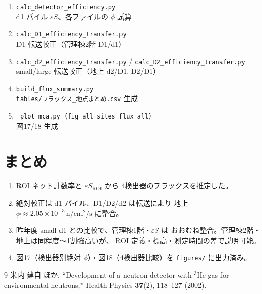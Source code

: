 \documentclass[a4paper,11pt]{ltjsarticle}
\begin{document}
\begin{enumerate}
  \item \texttt{calc\_detector\_efficiency.py} \\
        d1 パイル $\varepsilon S$、各ファイルの $\phi$ 試算
  \item \texttt{calc\_D1\_efficiency\_transfer.py} \\
        D1 転送較正（管理棟2階 D1/d1）
  \item \texttt{calc\_d2\_efficiency\_transfer.py} / \texttt{calc\_D2\_efficiency\_transfer.py} \\
        small/large 転送較正（地上 d2/D1, D2/D1）
  \item \texttt{build\_flux\_summary.py} \\
        \texttt{tables/フラックス\_地点まとめ.csv} 生成
  \item \texttt{\_plot\_mca.py}（\texttt{fig\_all\_sites\_flux\_all}） \\
        図17/18 生成
\end{enumerate}

\section{まとめ}

\begin{enumerate}
  \item ROI ネット計数率と $\varepsilon S_\mathrm{ROI}$ から
        4検出器のフラックスを推定した。
  \item 絶対較正は d1 パイル、D1/D2/d2 は転送により
        地上 $\phi\approx2.05\times10^{-3}\,\mathrm{n/cm^2/s}$ に整合。
  \item 昨年度 small d1 との比較で、管理棟1階・$\varepsilon S$ は
        おおむね整合。管理棟2階・地上は同程度〜1割強高いが、
        ROI 定義・標高・測定時間の差で説明可能。
  \item 図17（検出器別絶対 $\phi$）・図18（4検出器比較）を
        \texttt{figures/} に出力済み。
\end{enumerate}

\begin{thebibliography}{9}
  米内 建自 ほか,
  ``Development of a neutron detector with $^3$He gas for environmental neutrons,''
  Health Physics \textbf{37}(2), 118--127 (2002).
\end{thebibliography}
\end{document}
